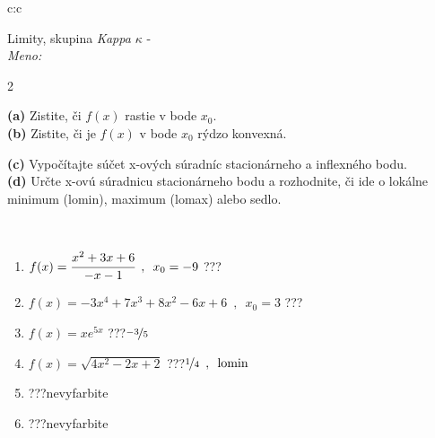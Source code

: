 \documentclass[10pt]{report}
\begin{document}
\begin{tabular}{c:c}
\begin{minipage}[c][104.5mm][t]{0.5\linewidth}
\begin{center}
\vspace{7mm}
{\huge Limity, skupina \textit{Kappa $\kappa$} -}\\[5mm]
\textit{Meno:}\phantom{xxxxxxxxxxxxxxxxxxxxxxxxxxxxxxxxxxxxxxxxxxxxxxxxxxxxxxxxxxxxxxxxx}\\[5mm]
\begin{minipage}{0.95\linewidth}
\begin{center}
{\small \begin{multicols}{2} \raggedright
\textbf{(a)} Zistite, či \(f(x)\) rastie v bode \(x_0\). \\[1mm]
\textbf{(b)} Zistite, či je \(f(x)\) v bode \(x_0\) rýdzo konvexná. \par \columnbreak
\textbf{(c)} Vypočítajte súčet x-ových súradníc stacionárneho a inflexného bodu. \\[1mm]
\textbf{(d)} Určte x-ovú súradnicu stacionárneho bodu a rozhodnite, či ide o lokálne minimum (lomin), maximum (lomax) alebo sedlo. \\[1mm]
\end{multicols}
}
\end{center}
\end{minipage}
\\[4mm]
\begin{minipage}{0.79\linewidth}
\begin{center}
\begin{varwidth}{\linewidth}
\begin{enumerate}
\normalsize
\item $f(x)=\cfrac{x^2+3x+6}{-x-1}\enspace , \enspace x_0=-9$\quad \dotfill\; ???\;\dotfill \quad {}
\item $f(x)=-3x^4+7x^3+8x^2-6x+6\enspace , \enspace x_0=3$\quad \dotfill\; ???\;\dotfill \quad {}
\item $f(x)=xe^{5x}$\quad \dotfill\; ???\;\dotfill \quad $\nicefrac{-3}{5}$
\item $f(x)=\sqrt{4x^2-2x+2}$\quad \dotfill\; ???\;\dotfill \quad $\nicefrac{1}{4}\enspace , \enspace\text{lomin}$
\item \quad \dotfill\; ???\;\dotfill \quad nevyfarbite
\item \quad \dotfill\; ???\;\dotfill \quad nevyfarbite
\end{enumerate}
\end{varwidth}

\end{center}
\end{minipage}
\end{center}
\end{minipage}
\end{tabular}
\end{document}
